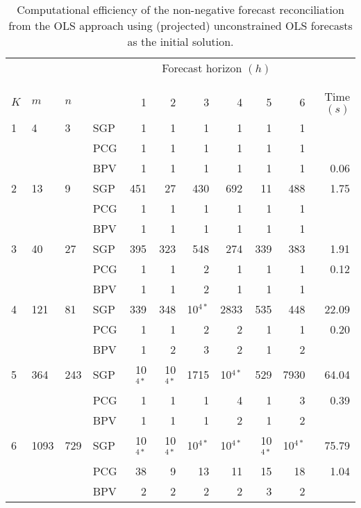 \documentclass[11pt]{article}
\newcommand{\0}{\phantom{0}}
\begin{document}
\begin{table}[ht]
	\small
	\tabcolsep=0.20cm
	\caption{Computational efficiency of the non-negative forecast reconciliation from the OLS approach using (projected) unconstrained OLS forecasts as the initial solution.}
	\label{tbl:perfnnolsp}
	\centering
	\begin{threeparttable}
		\begin{tabular}{llllrrrrrrr}
			\toprule
			& & & & \multicolumn{6}{c}{Forecast horizon $(h)$}\\[-0.4cm]\\\cline{5-10}\\[-0.3cm]
			$K$ & $m$ & $n$ & & 1 & 2 & 3 & 4 & 5 & 6 & Time $(s)$\\
			\midrule
			1 & 4 & 3 & SGP & 1 & 1 & 1 & 1 & 1 & 1 & \bm{$0.03$} \\
			& & & PCG & 1 & 1 & 1 & 1 & 1 & 1 & \bm{$0.03$} \\
			& & & BPV & 1 & 1 & 1 & 1 & 1 & 1 & 0.06 \\
			\midrule
			2 & 13 & 9 & SGP & 451 & 27 & 430 & 692 & 11 & 488 & 1.75 \\
			& & & PCG & 1 & 1 & 1 & 1 & 1 & 1 & \bm{$0.07$} \\
			& & & BPV & 1 & 1 & 1 & 1 & 1 & 1 & \bm{$0.07$} \\
			\midrule
			3 & 40 & 27 & SGP & 395 & 323 & 548 & 274 & 339 & 383 & 1.91 \\
			& & & PCG & 1 & 1 & 2 & 1 & 1 & 1 & 0.12 \\
			& & & BPV & 1 & 1 & 2 & 1 & 1 & 1 & \bm{$0.09$} \\
			\midrule
			4 & 121 & 81 & SGP & 339 & 348 & 10$^{4*}$ & 2833 & 535 & 448 & 22.09\\
			& & & PCG & 1 & 1 & 2 & 2 & 1 & 1 & 0.20 \\
			& & & BPV & 1 & 2 & 3 & 2 & 1 & 2 & \bm{$0.12$} \\
			\midrule
			5 & 364 & 243 & SGP & 10$^{4*}$ & 10$^{4*}$ & 1715 & 10$^{4*}$ & 529 & 7930 & 64.04 \\
			& & & PCG & 1 & 1 & 1 & 4 & 1 & 3 & 0.39 \\
			& & & BPV & 1 & 1 & 1 & 2 & 1 & 2 & \bm{$0.12$} \\
			\midrule
			6 & 1093 & 729 & SGP & 10$^{4*}$ & 10$^{4*}$ & 10$^{4*}$ & 10$^{4*}$ & 10$^{4*}$ & 10$^{4*}$ & 75.79\\
			& & & PCG & 38 & 9 & 13 & 11 & 15 & 18 & 1.04 \\
			& & & BPV & 2 & 2 & 2 & 2 & 3 & 2 & \bm{$0.19$} \\

\end{tabular}
\end{threeparttable}
\end{table}
\end{document}
